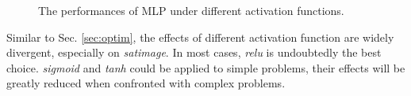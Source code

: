 \documentclass[12pt,a4paper]{article}
\theoremstyle{definition}
\begin{document}
\begin{figure}[H]
	\centering
	\caption{The performances of MLP under different activation functions.}
	\label{fig:mlp-activation}
\end{figure}

Similar to Sec. \ref{sec:optim}, the effects of different activation function are widely divergent, especially on \textit{satimage}. In most cases, \textit{relu} is undoubtedly the best choice. \textit{sigmoid} and \textit{tanh} could be applied to simple problems, their effects will be greatly reduced when confronted with complex problems.
\end{document}
